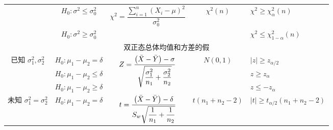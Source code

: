 \begin{table}[H]
{\begin{tabular}{ccccl}
                                                          & $H_0:\sigma^2\leqslant \sigma_0^2$   & $\chi^2=\dfrac{\displaystyle \sum_{i=1}^{n} (X_i-\mu)^2}{\sigma_0^2}$                                             & $\chi^2(n)$                                                                      & $\chi^2\geqslant \chi^2_\alpha(n)$                    \\
                                                          & $H_0:\sigma^2\geqslant \sigma_0^2$   &                                                                                                                   &                                                                                  & $\chi^2\leqslant \chi^2_{1-\alpha}(n)$                \\
            \midrule
            \multicolumn{5}{c}{双正态总体均值和方差的假}                                                                                                                                                                                                                                                                                                        \\
            \midrule
            \multirow{3}{*}{已知 $\sigma_1^2,\sigma_2^2$} & $H_0:\mu_1-\mu_2=\delta$             & \multirow{3}{*}{$Z=\dfrac{\qty(\bar{X}-\bar{Y})-\sigma}{\sqrt{\dfrac{\sigma_1^2}{n_1}+\dfrac{\sigma_2^2}{n_2}}}$} & \multirow{3}{*}{$N(0,1)$}                                                        & $|z|\geqslant z_{\alpha/2}$                           \\
                                                          & $H_0:\mu_1-\mu_2\leqslant \delta$    &                                                                                                                   &                                                                                  & $z\geqslant z_\alpha$                                 \\
                                                          & $H_0:\mu_1-\mu_2\geqslant \delta$    &                                                                                                                   &                                                                                  & $z\leqslant -z_\alpha $                               \\
            \midrule
            \multirow{3}{*}{未知 $\sigma_1^2=\sigma_2^2$} & $H_0:\mu_1-\mu_2=\delta$             & \multirow{3}{*}{$t=\dfrac{\qty(\bar{X}-\bar{Y})-\delta}{S_w\sqrt{\dfrac{1}{n_1}+\dfrac{1}{n_2}}}$}                & \multirow{3}{*}{$t(n_1+n_2-2)$}                                                  & $|t|\geqslant t_{\alpha/2}(n_1+n_2-2)$                \\

\end{tabular}}
\end{table}

